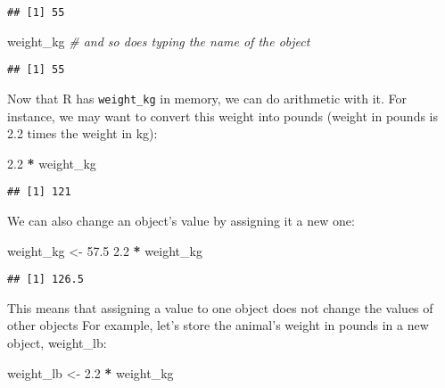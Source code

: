 \documentclass[]{book}
\newenvironment{Shaded}{\begin{snugshade}}{\end{snugshade}}
\newcommand{\CommentTok}[1]{\textcolor[rgb]{0.56,0.35,0.01}{\textit{#1}}}
\newcommand{\FloatTok}[1]{\textcolor[rgb]{0.00,0.00,0.81}{#1}}
\newcommand{\NormalTok}[1]{#1}
\newcommand{\OperatorTok}[1]{\textcolor[rgb]{0.81,0.36,0.00}{\textbf{#1}}}
\newcommand{\StringTok}[1]{\textcolor[rgb]{0.31,0.60,0.02}{#1}}
\begin{document}
\begin{verbatim}
## [1] 55
\end{verbatim}

\begin{Shaded}
\begin{Highlighting}[]
\NormalTok{weight_kg }\CommentTok{# and so does typing the name of the object}
\end{Highlighting}
\end{Shaded}

\begin{verbatim}
## [1] 55
\end{verbatim}

Now that R has \texttt{weight\_kg} in memory, we can do arithmetic with it. For instance, we may want to convert this weight into pounds (weight in pounds is 2.2 times the weight in kg):

\begin{Shaded}
\begin{Highlighting}[]
\FloatTok{2.2} \OperatorTok{*}\StringTok{ }\NormalTok{weight_kg}
\end{Highlighting}
\end{Shaded}

\begin{verbatim}
## [1] 121
\end{verbatim}

We can also change an object's value by assigning it a new one:

\begin{Shaded}
\begin{Highlighting}[]
\NormalTok{weight_kg <-}\StringTok{ }\FloatTok{57.5}
\FloatTok{2.2} \OperatorTok{*}\StringTok{ }\NormalTok{weight_kg}
\end{Highlighting}
\end{Shaded}

\begin{verbatim}
## [1] 126.5
\end{verbatim}

This means that assigning a value to one object does not change the values of other objects For example, let's store the animal's weight in pounds in a new object, weight\_lb:

\begin{Shaded}
\begin{Highlighting}[]
\NormalTok{weight_lb <-}\StringTok{ }\FloatTok{2.2} \OperatorTok{*}\StringTok{ }\NormalTok{weight_kg}
\end{Highlighting}
\end{Shaded}
\end{document}
